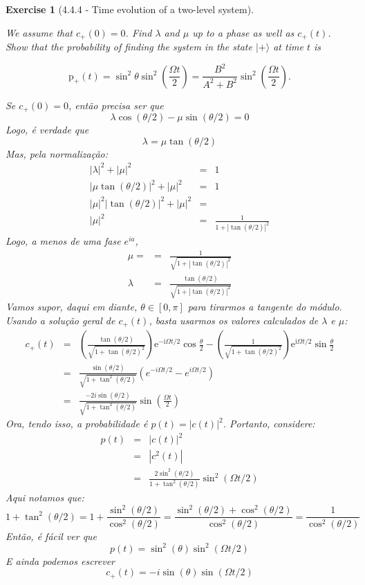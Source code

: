 \documentclass[12pt]{article}
\def\be{\begin{equation}}
\def\ee{\end{equation}}
\def\bea{\begin{eqnarray*}}
\def\eea{\end{eqnarray*}}
\def\f{\frac}
\def\l{\left}
\def\r{\right}
\newtheorem{exercise}{Exercise}
\begin{document}
\begin{exercise}[4.4.4 - Time evolution of a two-level system]
\begin{exercises}
\begin{multianswer}
			
		\end{multianswer}
		
		\item We assume that $c_{+}(0)=0$. Find $\lambda$ and $\mu$ up to a phase as well as $c_{+}(t)$. Show that the probability of finding the system in the state $|+\rangle$ at time $t$ is
		
		$$
		\mathrm{p}_{+}(t)=\sin ^{2} \theta \sin ^{2}\left(\frac{\Omega t}{2}\right)=\frac{B^{2}}{A^{2}+B^{2}} \sin ^{2}\left(\frac{\Omega t}{2}\right) .
		$$
		\begin{multianswer}[true]
			Se $c_+(0)=0$, então precisa ser que
			\be
				 \lambda\cos(\theta/2) - \mu\sin(\theta/2) = 0
			\ee
			Logo, é verdade que
			\be
				\lambda = \mu \tan(\theta/2)
			\ee
			Mas, pela normalização:
			\bea
				|\lambda|^2 + |\mu|^2 &=& 1 \\
				|\mu\tan(\theta/2)|^2 + |\mu|^2 &=& 1 \\
				|\mu|^2|\tan(\theta/2)|^2 + |\mu|^2 &=& \\
				|\mu|^2 &=& \f{1}{1 + |\tan(\theta/2)|^2}
			\eea
			Logo, a menos de uma fase $e^{ia}$, 
			\bea
				\mu =  &=& \f{1}{\sqrt{1 + |\tan(\theta/2)|^2}} \\
				\lambda  &=& \f{\tan(\theta/2)}{\sqrt{1 + |\tan(\theta/2)|^2}}
			\eea
			Vamos supor, daqui em diante, $\theta\in[0, \pi]$ para tirarmos a tangente do módulo. Usando a solução geral de $c_+(t)$, basta usarmos os valores calculados de $\lambda$ e $\mu$:
			\bea
				c_+(t) &=& \l(\f{\tan(\theta/2)}{\sqrt{1 + \tan(\theta/2)^2}}\r) \mathrm{e}^{-\mathrm{i} \Omega t / 2} \cos \frac{\theta}{2}-\l( \f{1}{\sqrt{1 + \tan(\theta/2)^2}}\r) \mathrm{e}^{\mathrm{i} \Omega t / 2} \sin \frac{\theta}{2} \\
					&=& \f{\sin(\theta/2)}{\sqrt{1+\tan^2(\theta/2)}}\l( e^{-i\Omega t/2} - e^{i\Omega t/2}\r) \\
					&=& \f{-2i\sin(\theta/2)}{\sqrt{1+\tan^2(\theta/2)}} \sin\l(\f{\Omega t}{2}\r)
			\eea 
			Ora, tendo isso, a probabilidade é $p(t)=|c(t)|^2$. Portanto, considere:
			\bea
				p(t) &=& |c(t)|^2 \\
					&=& |c^2(t)| \\
					&=& \f{2\sin^2(\theta/2)}{1+\tan^2(\theta/2)} \sin^2(\Omega t/2)
			\eea
			Aqui notamos que:
			\be
				1+\tan^2(\theta/2) = 1 + \f{\sin^2(\theta/2)}{\cos^2(\theta/2)} = \f{\sin^2(\theta/2) + \cos^2(\theta/2)}{\cos^2(\theta/2)} = \f{1}{\cos^2(\theta/2)}
			\ee
			Então, é fácil ver que
			\be
				p(t) = \sin^2(\theta)\sin^2(\Omega t/2)
			\ee
			E ainda podemos escrever
			\be
				c_+(t) = -i\sin(\theta)\sin(\Omega t/2)
			\ee
		\end{multianswer}
		\end{exercises}
	\end{exercise}
	
\end{document}
